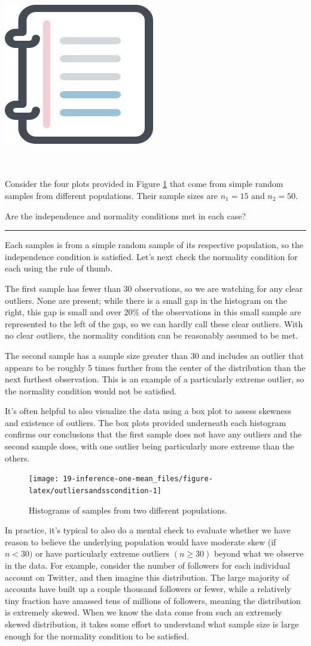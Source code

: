 \documentclass[
  10pt,
  openany]{book}
\newenvironment{mdframedwithfootGPWE}
{   
    \savenotes
    \begin{mdframed}[%
    topline=true, bottomline=true, linecolor=oiB, linewidth=0.5pt,
    rightline=false, leftline=false,
    backgroundcolor=oiLGray]
    \renewcommand{\thempfootnote}{\arabic{footnote}}
    }
{
    \end{mdframed}
    \spewnotes
}
\newenvironment{workedexample}{
    \let\oldrule\rule
    \renewcommand{\rule}[2]{\vspace{-2mm}\oldrule{##1}{##2}\vspace{-2mm}}
\vspace{4mm}
\begin{mdframedwithfootGPWE}
\begin{minipage}[t]{0.10\textwidth}
{$\:$ \\ \setkeys{Gin}{width=2.5em,keepaspectratio}\includegraphics{images/_icons/worked-example.png}}
\end{minipage}
\hfill
\begin{minipage}[t]{0.90\textwidth}
\vspace{-2mm}
\setlength{\parskip}{1em}
\noindent\textbf{\color{oiB}\small\fontfamily{phv}\selectfont{\MakeUppercase{Example}}} $\:$ \\ \\
}{\end{minipage}
\end{mdframedwithfootGPWE}
\vspace{4mm}
}
\begin{document}
\begin{workedexample}
Consider the four plots provided in Figure \ref{fig:outliersandsscondition} that come from simple random samples from different populations.
Their sample sizes are \(n_1 = 15\) and \(n_2 = 50.\)

Are the independence and normality conditions met in each case?

\begin{center}\rule{0.5\linewidth}{0.5pt}\end{center}

Each samples is from a simple random sample of its respective population, so the independence condition is satisfied.
Let's next check the normality condition for each using the rule of thumb.

The first sample has fewer than 30 observations, so we are watching for any clear outliers.
None are present; while there is a small gap in the histogram on the right, this gap is small and over 20\% of the observations in this small sample are represented to the left of the gap, so we can hardly call these clear outliers.
With no clear outliers, the normality condition can be reasonably assumed to be met.

The second sample has a sample size greater than 30 and includes an outlier that appears to be roughly 5 times further from the center of the distribution than the next furthest observation.
This is an example of a particularly extreme outlier, so the normality condition would not be satisfied.

It's often helpful to also visualize the data using a box plot to assess skewness and existence of outliers.
The box plots provided underneath each histogram confirms our conclusions that the first sample does not have any outliers and the second sample does, with one outlier being particularly more extreme than the others.

\end{workedexample}

\begin{figure}[h]

{\centering \texttt{[image: 19-inference-one-mean\_files/figure-latex/outliersandsscondition-1]} 

}

\caption{Histograms of samples from two different populations.}\label{fig:outliersandsscondition}
\end{figure}

In practice, it's typical to also do a mental check to evaluate whether we have reason to believe the underlying population would have moderate skew (if \(n < 30)\) or have particularly extreme outliers \((n \geq 30)\) beyond what we observe in the data.
For example, consider the number of followers for each individual account on Twitter, and then imagine this distribution.
The large majority of accounts have built up a couple thousand followers or fewer, while a relatively tiny fraction have amassed tens of millions of followers, meaning the distribution is extremely skewed.
When we know the data come from such an extremely skewed distribution, it takes some effort to understand what sample size is large enough for the normality condition to be satisfied.
\end{document}
